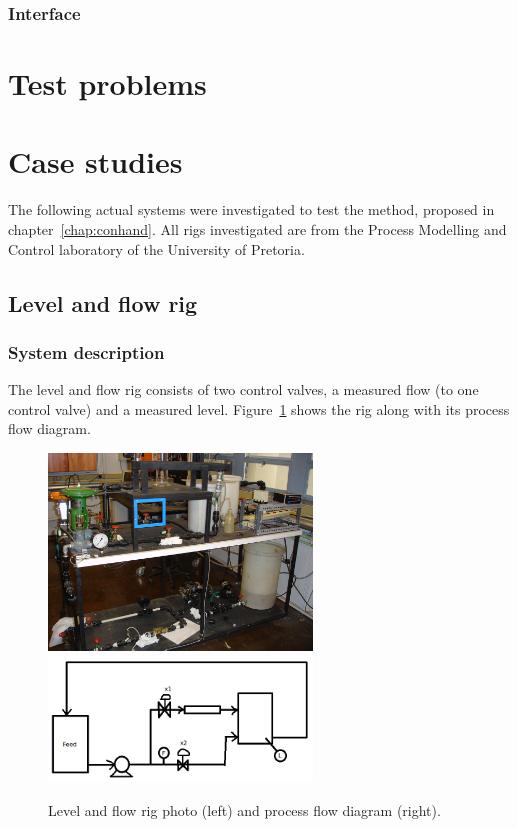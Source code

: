 \subsubsection{Interface}


\section{Test problems}


\section{Case studies}
The following actual systems were investigated to test the method, proposed in chapter~\ref{chap:conhand}.
All rigs investigated are from the Process Modelling and Control laboratory of the University of Pretoria.

\subsection{Level and flow rig}
\subsubsection{System description}
The level and flow rig consists of two control valves, a measured flow (to one control valve) and a measured level.
Figure~\ref{fig:flowphoto} shows the rig along with its process flow diagram.
\begin{figure}[htbp]
  \centering
    \includegraphics[width=7cm]{graph/flowphoto.JPG}
    \qquad
    \includegraphics[width=7cm]{graph/flowpfd}
  \caption[Level and flow rig photo and flow diagram]{Level and flow rig photo (left) and process flow diagram (right).}
  \label{fig:flowphoto}
\end{figure}

